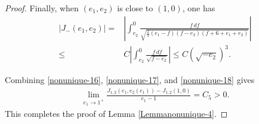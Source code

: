 \documentclass[reqno,12pt]{amsart}
\begin{document}
\begin{proof}
Finally, when $(e_1, e_2)$ is close to $(1, 0)$, one has
\begin{equation}\label{nonunique-18}
\begin{aligned}
    |J_{-}(e_1, e_2)| = & \left|\int_{e_2}^0 \frac{f\, df }{\sqrt{\frac23(e_1 -f) (f-e_2) (f+6+ e_1 +e_2)}} \right| \\
    \leq & C \left| \int_{e_2}^0 \frac{f\, df }{\sqrt{f-e_2}} \right| 
    \le C ( \sqrt{-e_2} )^3. 
\end{aligned}
\end{equation}

Combining \eqref{nonunique-16}, \eqref{nonunique-17}, and \eqref{nonunique-18} gives 
\begin{align*}
\lim_{e_1\to 1^+ }\frac{J_{1,2}(e_1, e_2(e_1)) - J_{1, 2}(1, 0)}{e_1 -1} = C_5 >0.
\end{align*}
This completes the proof of Lemma \ref{Lemmanonunique-4}.
\end{proof}
\end{document}
